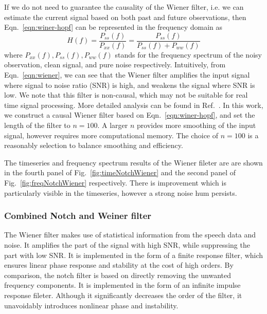 \documentclass[paper-main.tex]{subfiles}
\begin{document}
If we do not need to guarantee the causality of the Wiener filter, i.e. we can estimate the current signal based on both past and future observations, then Eqn.~\ref{eqn:winer-hopf} can be represented in the frequency domain as
\begin{equation}
\label{eqn:wiener}
    H(f)=\frac{P_{ss}(f)}{P_{xx}(f)}=\frac{P_{ss}(f)}{P_{ss}(f)+P_{ww}(f)}
\end{equation}
where $P_{xx}(f),P_{ss}(f),P_{ww}(f)$ stands for the frequency spectrum of the noisy observation, clean signal, and pure noise respectively. 
Intuitively, from Eqn.~\ref{eqn:wiener}, we can see that the Wiener filter amplifies the input signal where signal to noise ratio (SNR) is high, and weakens the signal where SNR is low.
We note that this filter is non-causal, which may not be suitable for real time signal processing. 
More detailed analysis can be found in Ref.~\citep{10.5555/151045}. 
In this work, we construct a causal Wiener filter based on Eqn.~\ref{eqn:winer-hopf}, and set the length of the filter to $n=100$. 
A larger $n$ provides more smoothing of the input signal, however requires more computational memory. 
The choice of $n=100$ is a reasonably selection to balance smoothing and efficiency. 

The timeseries and frequency spectrum results of the Wiener fileter are are shown in the fourth panel of Fig.~\ref{fig:timeNotchWiener} and the second panel of Fig.~\ref{fig:freqNotchWiener} respectively. 
There is improvement which is particularly visible in the timeseries, however a strong noise hum persists. 


\subsubsection{Combined Notch and Weiner filter}
The Wiener filter makes use of statistical information from the speech data and noise. 
It amplifies the part of the signal with high SNR, while suppressing the part with low SNR. 
It is implemented in the form of a finite response filter, which ensures linear phase response and stability at the cost of high orders. 
By comparison, the notch filter is based on directly removing the unwanted frequency components. 
It is implemented in the form of an infinite impulse response fileter. 
Although it significantly decreases the order of the filter, it unavoidably introduces nonlinear phase and instability. 
\end{document}
